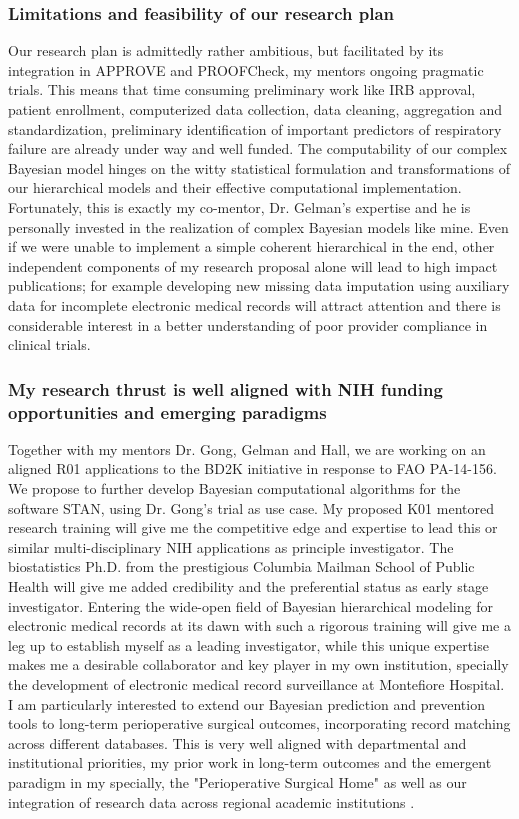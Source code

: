 \documentclass[11pt,notitlepage]{article}
\begin{document}
\subsubsection*{Limitations and feasibility of our research plan }
Our research plan is admittedly rather ambitious, but facilitated by its integration in APPROVE and PROOFCheck, my mentors ongoing pragmatic trials. This means that time consuming preliminary work like IRB approval, patient enrollment, computerized data collection, data cleaning, aggregation and standardization, preliminary identification of important predictors of respiratory failure are already under way and well funded. The computability of our complex Bayesian model hinges on the witty statistical formulation and transformations of our hierarchical models and their effective computational implementation. Fortunately, this is exactly my co-mentor, Dr. Gelman's expertise and he is personally invested in the realization of complex Bayesian models like mine. Even if we were unable to implement a simple coherent hierarchical in the end, other independent components of my research proposal alone will lead to high impact publications; for example developing new missing data imputation using auxiliary data for incomplete electronic medical records will attract attention and there is considerable interest in a better understanding of poor provider compliance in clinical trials. 

\subsubsection*{My research thrust is well aligned with NIH funding opportunities and emerging paradigms}
Together with my mentors Dr. Gong, Gelman and Hall, we are working on an aligned R01 applications to the BD2K initiative in response to FAO PA-14-156. We propose to further develop Bayesian computational algorithms for the software STAN, using Dr. Gong's trial as use case. My proposed K01 mentored research training will give me the competitive edge and expertise to lead this or similar multi-disciplinary NIH applications as principle investigator. The biostatistics Ph.D. from the prestigious Columbia Mailman School of Public Health will give me added credibility and the preferential status as early stage investigator. Entering the wide-open field of Bayesian hierarchical modeling for electronic medical records at its dawn with such a rigorous training will give me a leg up to establish myself as a leading investigator, while this unique expertise makes me a desirable collaborator and key player in my own institution, specially the development of electronic medical record surveillance at Montefiore Hospital. I am particularly interested to extend our Bayesian prediction and prevention tools to long-term perioperative surgical outcomes, incorporating record matching across different databases. This is very well aligned with departmental and institutional priorities, my prior work in long-term outcomes \cite{Andreae_23811426} and the emergent paradigm in my specially, the "Perioperative Surgical Home" \cite{Vetter_24781579} as well as our integration of research data across regional academic institutions \cite{Kaushal_24821739}.
\end{document}
